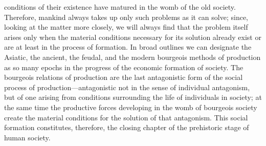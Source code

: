 conditions of their existence have matured in the womb of the old
society. Therefore, mankind always takes up only such problems as it
can solve; since, looking at the matter more closely, we will always
 find that the problem itself arises only when the material
conditions necessary for its solution already exist or are at least in
the process of formation. In broad outlines we can designate the
Asiatic, the ancient, the feudal, and the modern bourgeois methods of
production as so many epochs in the progress of the economic formation
of society. The bourgeois relations of production are the last
antagonistic form of the social process of production---antagonistic
not in the sense of individual antagonism, but of one arising from
conditions surrounding the life of individuals in society; at the same
time the productive forces developing in the womb of bourgeois society
create the material conditions for the solution of that antagonism.
This social formation constitutes, therefore, the closing chapter of
the prehistoric stage of human society.

